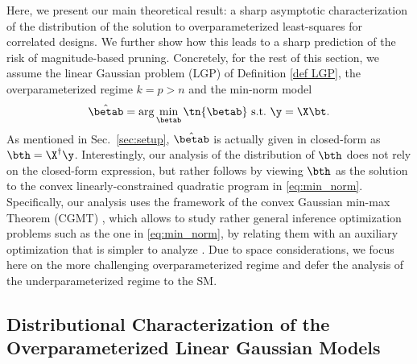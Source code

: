 Here, we present our main theoretical result: a sharp asymptotic characterization of the distribution of the solution to overparameterized least-squares for correlated designs. We further show how this leads to a sharp prediction of the risk of magnitude-based pruning.  
Concretely, for the rest of this section, we assume the linear Gaussian problem (LGP) of Definition \ref{def LGP}, the overparameterized regime $k=p>n$ and the min-norm model
\begin{align}
\hat{\betab} = \arg\min_{\betab} \tn{\betab} ~\text{s.t.}~\y=\X\bt.\label{eq:min_norm}
\end{align} 
As mentioned in Sec.~\ref{sec:setup}, $\hat{\betab}$ is actually given in closed-form as $\bth=\X^\dagger \y$. Interestingly, our analysis of the distribution of $\bth$ does not rely on the closed-form expression, but rather follows by viewing $\bth$ as the solution to the convex linearly-constrained quadratic program in \eqref{eq:min_norm}. Specifically, our analysis uses the framework of the convex Gaussian min-max Theorem (CGMT) \cite{thrampoulidis2015regularized}, which allows to study rather general inference optimization problems such as the one in \eqref{eq:min_norm}, by relating them with an auxiliary optimization that is simpler to analyze \cite{StoLASSO,oymak2013squared,thrampoulidis2015regularized,thrampoulidis2018precise,salehi2019impact,taheri2020fundamental}.
%
Due to space considerations, we focus here on the more challenging overparameterized regime and defer the analysis of the underparameterized regime to the SM. 



\subsection{Distributional Characterization of the Overparameterized Linear Gaussian Models}

